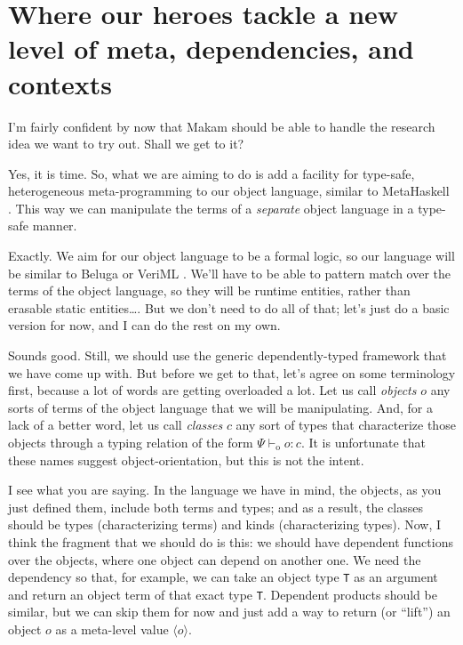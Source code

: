 \section{Where our heroes tackle a new level of meta, dependencies, and
contexts}\label{where-our-heroes-tackle-a-new-level-of-meta-dependencies-and-contexts}

\heroSTUDENT{} I'm fairly confident by now that Makam should be able to handle
the research idea we want to try out. Shall we get to it?

\heroADVISOR{} Yes, it is time. So, what we are aiming to do is add a facility
for type-safe, heterogeneous meta-programming to our object language,
similar to MetaHaskell \citep{mainland2012explicitly}. This way we can
manipulate the terms of a \emph{separate} object language in a type-safe
manner.

\heroSTUDENT{} Exactly. We aim for our object language to be a formal logic,
so our language will be similar to Beluga \citep{beluga-main-reference}
or VeriML \citep{veriml-main-reference}. We'll have to be able to
pattern match over the terms of the object language, so they will be
runtime entities, rather than erasable static entities\ldots{}. But we
don't need to do all of that; let's just do a basic version for now, and
I can do the rest on my own.

\newcommand\dep[1]{\ensuremath{#1}}
\newcommand\lift[1]{\ensuremath{\langle#1\rangle}}
\newcommand\odash[0]{\ensuremath{\vdash_{\text{o}}}}
\newcommand\wf[0]{\ensuremath{\; \text{wf}}}
\newcommand\aq[1]{\ensuremath{\texttt{aq}(#1)}}
\newcommand\aqopen[1]{\ensuremath{\texttt{aqopen}(#1)}}

\heroADVISOR{} Sounds good. Still, we should use the generic dependently-typed
framework that we have come up with. But before we get to that, let's
agree on some terminology first, because a lot of words are getting
overloaded a lot. Let us call \emph{objects} \(o\) any sorts of terms of
the object language that we will be manipulating. And, for a lack of a
better word, let us call \emph{classes} \(c\) any sort of types that
characterize those objects through a typing relation of the form
\(\Psi \odash o : c\). It is unfortunate that these names suggest
object-orientation, but this is not the intent.

\heroSTUDENT{} I see what you are saying. In the language we have in mind, the
objects, as you just defined them, include both terms and types; and as
a result, the classes should be types (characterizing terms) and kinds
(characterizing types). Now, I think the fragment that we should do is
this: we should have dependent functions over the objects, where one
object can depend on another one. We need the dependency so that, for
example, we can take an object type \texttt{T} as an argument and return
an object term of that exact type \texttt{T}. Dependent products should
be similar, but we can skip them for now and just add a way to return
(or ``lift'') an object \(o\) as a meta-level value \(\lift{o}\).

